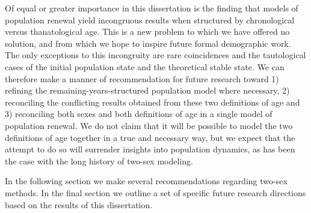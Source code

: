 Of equal or greater importance in this dissertation is the finding that models
of population renewal yield incongruous results when structured by
chronological versus thanatological age. This is a new problem to 
which we have offered no solution, and from which we hope to inspire future
formal demographic work. The only exceptions to this incongruity are rare
coincidences and the tautological cases of the initial population state and 
the theoretical stable state. We can therefore make a manner of recommendation
for future research toward 1) refining the remaining-years-structured population
model where necessary, 2) reconciling the conflicting results obtained from
these two definitions of age and 3) reconciling both sexes and both
definitions of age in a single model of population renewal. We do not claim that
it will be possible to model the two definitions of age together in a true and
necessary way, but we expect that the attempt to do so will surrender insights
into population dynamics, as has been the case with the long history of two-sex
modeling.

In the following section we make several recommendations regarding two-sex
methods. In the final section we outline a set of specific future research
directions based on the results of this dissertation.

